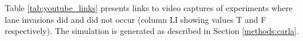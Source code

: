 
Table \ref{tab:youtube_links} presents links to video captures of experiments where lane invasions did and did not occur (column LI showing values T and F respectively). The simulation is generated as described in Section \ref{methods:carla}.

